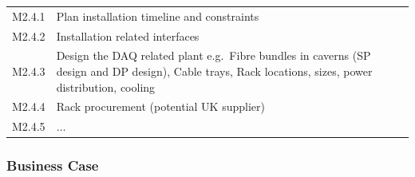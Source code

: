 \begin{tabular}{lp{12cm}}
M2.4.1 & Plan installation timeline and constraints \\
M2.4.2 & Installation related interfaces\\
M2.4.3 & Design the DAQ related plant e.g.\ Fibre bundles in caverns
         (SP design and DP design), Cable trays, Rack locations,
         sizes, power distribution, cooling\\
M2.4.4 & Rack procurement (potential UK supplier)\\
M2.4.5 & $\ldots$\\
\end{tabular}


\subsubsection{Business Case}
\newpage